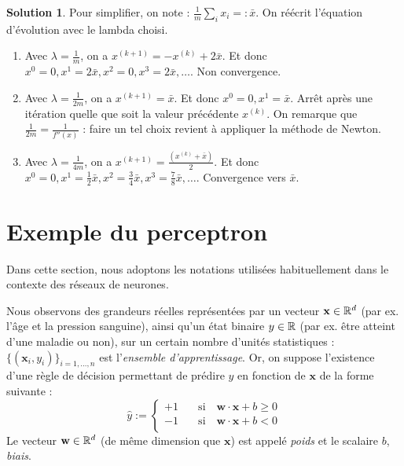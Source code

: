 \documentclass[a4paper,francais]{article}
\newcommand{\R}{{\ensuremath\mathbb{R}}}
\theoremstyle{definition}
\newtheorem*{solution}{Solution}
\begin{document}
\begin{solution}
  Pour simplifier, on note : $\frac{1}{m}\sum_ix_i =: \bar{x}$.
  On réécrit l'équation d'évolution avec le lambda choisi. 
  \begin{enumerate}
  \item Avec $\lambda = \frac{1}{m}$,
    on a $x^{(k+1)} = - x^{(k)} + 2\bar{x}$. Et donc
    $x^0 = 0, x^1 = 2\bar{x}, x^2 = 0, x^3 = 2\bar{x}, \dots$.
    Non convergence. 
  \item Avec $\lambda = \frac{1}{2m}$,
    on a $x^{(k+1)} = \bar{x}$. Et donc
    $x^0 = 0, x^1 = \bar{x}$. Arrêt après une itération
    quelle que soit la valeur précédente $x^{(k)}$.
    On remarque que $\frac{1}{2m} = \frac{1}{f''(x)}$ :
    faire un tel choix revient à appliquer la méthode de Newton. 
  \item Avec $\lambda = \frac{1}{4m}$,
    on a $x^{(k+1)} = \frac{(x^{(k)} + \bar{x})}{2}$. Et donc
    $x^0 = 0, x^1 = \frac{1}{2}\bar{x}, x^2 = \frac{3}{4}\bar{x},
    x^3 = \frac{7}{8}\bar{x}, \dots$.
    Convergence vers $\bar{x}$. 
  \end{enumerate}
\end{solution}

\section{Exemple du perceptron}
\label{sec:perceptron}

\let\vec\mathbf

Dans cette section, nous adoptons les notations utilisées habituellement
dans le contexte des réseaux de neurones.

Nous observons des grandeurs réelles représentées par un vecteur $\vec{x} \in \R^d$
(par ex. l'âge et la pression sanguine), ainsi qu'un état binaire $y \in \R$
(par ex. être atteint d'une maladie ou non), sur un certain nombre d'unités
statistiques : $\{(\vec{x}_i,y_i)\}_{i = 1,\dots, n}$ est l'\emph{ensemble d'apprentissage}.
Or, on suppose l'existence d'une règle de décision permettant de prédire $y$
en fonction de $\vec{x}$ de la forme suivante :
\[
\hat{y} :=
\left\{
\begin{array}{ll}
  +1 & \quad \mathrm{si}\quad \vec{w}\cdot\vec{x} + b \geq 0 \\
  -1 & \quad \mathrm{si}\quad \vec{w}\cdot\vec{x} + b < 0 \\
\end{array}
\right.
\]
Le vecteur $\vec{w} \in \R^d$ (de même dimension que $\vec{x}$)
est appelé \emph{poids} et le scalaire $b$, \emph{biais}.
\end{document}
